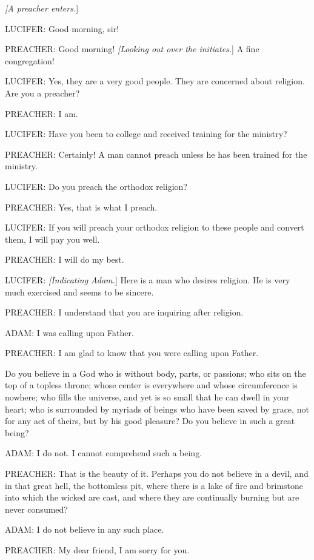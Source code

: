 			\textit{[A preacher enters.}]

			LUCIFER: Good morning, sir!

			PREACHER: Good morning! \textit{[Looking out over the initiates.}] A fine congregation!

			LUCIFER: Yes, they are a very good people. They are concerned about religion. Are you a preacher?

			PREACHER: I am.

			LUCIFER: Have you been to college and received training for the ministry?

			PREACHER: Certainly! A man cannot preach unless he has been trained for the ministry.

			LUCIFER: Do you preach the orthodox religion?

			PREACHER: Yes, that is what I preach.

			LUCIFER: If you will preach your orthodox religion to these people and convert them, I will pay you well.

			PREACHER: I will do my best.

			LUCIFER: \textit{[Indicating Adam.}] Here is a man who desires religion. He is very much exercised and seems to be sincere.

			PREACHER: I understand that you are inquiring after religion.

			ADAM: I was calling upon Father.

			PREACHER: I am glad to know that you were calling upon Father.

			Do you believe in a God who is without body, parts, or passions; who sits on the top of a topless throne; whose center is everywhere and whose circumference is nowhere; who fills the universe, and yet is so small that he can dwell in your heart; who is surrounded by myriads of beings who have been saved by grace, not for any act of theirs, but by his good pleasure? Do you believe in such a great being?

			ADAM: I do not. I cannot comprehend such a being.

			PREACHER: That is the beauty of it. Perhaps you do not believe in a devil, and in that great hell, the bottomless pit, where there is a lake of fire and brimstone into which the wicked are cast, and where they are continually burning but are never consumed?

			ADAM: I do not believe in any such place.

			PREACHER: My dear friend, I am sorry for you.

